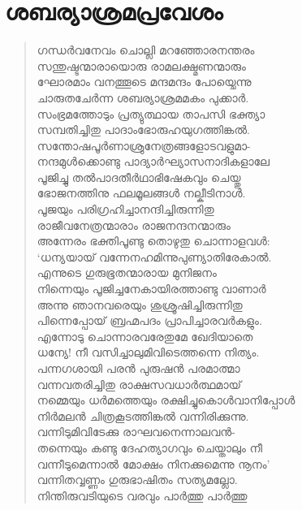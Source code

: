 \section{ശബര്യാശ്രമപ്രവേശം}

\begin{verse}
ഗന്ധര്‍വനേവം ചൊല്ലി മറഞ്ഞോരനന്തരം\\
സന്തുഷ്ടന്മാരായൊരു രാമലക്ഷ്മണന്മാരും\\
ഘോരമാം വനത്തൂടെ മന്ദമന്ദം പോയ്ചെന്നു\\
ചാരുതചേര്‍ന്ന ശബര്യാശ്രമമകം പുക്കാര്‍.\\
സംഭ്രമത്തോടും പ്രത്യുത്ഥായ താപസി ഭക്ത്യാ\\
സമ്പതിച്ചിതു പാദാംഭോരുഹയുഗത്തിങ്കല്‍.\\
സന്തോഷപൂര്‍ണാശ്രുനേത്രങ്ങളോടവളുമാ-\\
നന്ദമുള്‍ക്കൊണ്ടു പാദ്യാര്‍ഘ്യാസനാദികളാലേ\\
പൂജിച്ചു തല്‍പാദതീര്‍ഥാഭിഷേകവും ചെയ്തു\\
ഭോജനത്തിനു ഫലമൂലങ്ങള്‍ നല്കീടിനാള്‍.\\
പൂജയും പരിഗ്രഹിച്ചാനന്ദിച്ചിരുന്നിതു\\
രാജീവനേത്രന്മാരാം രാജനന്ദനന്മാരും\\
അന്നേരം ഭക്തിപൂണ്ടു തൊഴുതു ചൊന്നാളവള്‍:\\
‘ധന്യയായ് വന്നേനഹമിന്നുപുണ്യാതിരേകാല്‍.\\
എന്നുടെ ഗുരുഭൂതന്മാരായ മുനിജനം\\
നിന്നെയും പൂജിച്ചനേകായിരത്താണ്ടു വാണാര്‍\\
അന്നു ഞാനവരെയും ശുശ്രൂഷിച്ചിരുന്നിതു\\
പിന്നെപ്പോയ് ബ്രഹ്മപദം പ്രാപിച്ചാരവര്‍കളും.\\
എന്നോടു ചൊന്നാരവരേതുമേ ഖേദിയാതെ\\
ധന്യേ! നീ വസിച്ചാലുമിവിടെത്തന്നെ നിത്യം.\\
പന്നഗശായി പരന്‍ പുരുഷന്‍ പരമാത്മാ\\
വന്നവതരിച്ചിതു രാക്ഷസവധാര്‍ത്ഥമായ്\\
നമ്മെയും ധര്‍മത്തെയും രക്ഷിച്ചുകൊള്‍വാനിപ്പോള്‍\\
നിര്‍മലന്‍ ചിത്രകൂടത്തിങ്കല്‍ വന്നിരിക്കുന്നു.\\
വന്നിടുമിവിടേക്കു രാഘവനെന്നാലവന്‍-\\
തന്നെയും കണ്ടു ദേഹത്യാഗവും ചെയ്താലും നീ\\
വന്നീടുമെന്നാല്‍ മോക്ഷം നിനക്കുമെന്നു നൂനം’\\
വന്നിതവ്വണ്ണം ഗുരുഭാഷിതം സത്യമല്ലോ.\\
നിന്തിരുവടിയുടെ വരവും പാര്‍ത്തു പാര്‍ത്തു\\

\end{verse}

